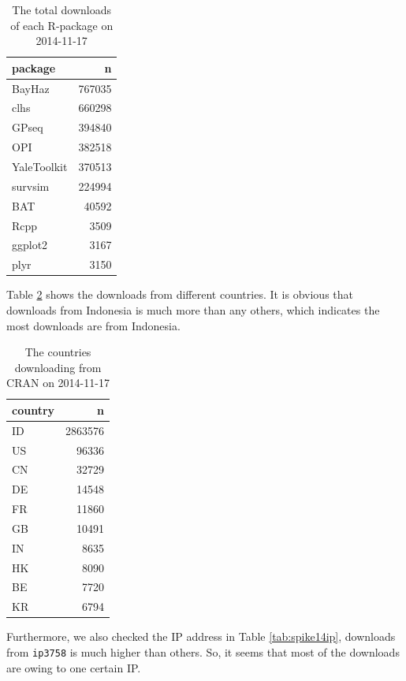 \documentclass[
]{book}
\begin{document}
\begin{table}

\caption{\label{tab:spike14count}The total downloads of each R-package on 2014-11-17}
\centering
\begin{tabular}[t]{l|r}
\hline
package & n\\
\hline
BayHaz & 767035\\
\hline
clhs & 660298\\
\hline
GPseq & 394840\\
\hline
OPI & 382518\\
\hline
YaleToolkit & 370513\\
\hline
survsim & 224994\\
\hline
BAT & 40592\\
\hline
Rcpp & 3509\\
\hline
ggplot2 & 3167\\
\hline
plyr & 3150\\
\hline
\end{tabular}
\end{table}

Table \ref{tab:spike14country} shows the downloads from different countries. It is obvious that downloads from Indonesia is much more than any others, which indicates the most downloads are from Indonesia.

\begin{table}

\caption{\label{tab:spike14country}The countries downloading from CRAN on 2014-11-17}
\centering
\begin{tabular}[t]{l|r}
\hline
country & n\\
\hline
ID & 2863576\\
\hline
US & 96336\\
\hline
CN & 32729\\
\hline
DE & 14548\\
\hline
FR & 11860\\
\hline
GB & 10491\\
\hline
IN & 8635\\
\hline
HK & 8090\\
\hline
BE & 7720\\
\hline
KR & 6794\\
\hline
\end{tabular}
\end{table}

Furthermore, we also checked the IP address in Table \ref{tab:spike14ip}, downloads from \texttt{ip3758} is much higher than others. So, it seems that most of the downloads are owing to one certain IP.
\end{document}
